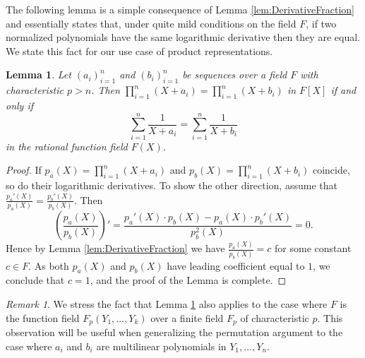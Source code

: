 \documentclass[11pt]{article}
\newtheorem{lem}[]{Lemma}
\theoremstyle{definition}
\theoremstyle{remark}
\newtheorem{rem}[thm]{Remark}
\begin{document}
The following lemma is a simple consequence of Lemma \ref{lem:DerivativeFraction} and essentially states that, under quite mild conditions on the field $F$, if two normalized polynomials have the same logarithmic derivative then they are equal. 
We state this fact for our use case of product representations.
\begin{lem}
\label{lem:LogarithmicDerivative}
Let $(a_i)_{i=1}^n$ and $(b_i)_{i=1}^n$ be sequences  over a field $F$ with characteristic $p > n$. 
Then
$
\prod_{i=1}^n \left(X + a_i \right) =\prod_{i=1}^n \left(X + b_i \right)
$
in $F[X]$ if and only if  
\begin{equation*}
\sum_{i=1}^n \frac{1}{X + a_i} =\sum_{i=1} ^n\frac{1}{X + b_i}
\end{equation*}
in the rational function field $F(X)$.
\end{lem}

\begin{proof}
If  $p_a(X) = \prod_{i=1}^n \left(X + a_i\right)$ and $p_b(X) = \prod_{i=1}^n \left(X + b_i\right)$
coincide, so do their logarithmic derivatives.
To show the other direction, assume that 
$
\frac{p_a'(X)}{p_a(X)}  = \frac{p_b'(X)}{p_b(X)}.
$
Then 
\[
\left(\frac{p_a(X)}{p_b(X)}\right)'  = \frac{p_a'(X)\cdot p_b(X) - p_a(X)\cdot  p_b'(X)} {p_b^2(X)} = 0.
\]
Hence by Lemma \ref{lem:DerivativeFraction} we have $\frac{p_a(X)}{p_b(X)} = c$ for some constant  $c \in F$.
As both $p_a(X)$ and $p_b(X)$ have leading coefficient equal to $1$, we conclude that $c =1$, and the proof of the Lemma is complete.
\end{proof}
\begin{rem}
\label{rem:LogarithmicDerivativeFunctionField}
We stress the fact that Lemma \ref{lem:LogarithmicDerivative} also applies to the case where $F$  is the function field $F_p(Y_1,\ldots, Y_k)$ over a finite field $F_p$ of characteristic $p$.
This observation will be useful when generalizing the permutation argument to the case where $a_i$ and $b_i$ are multilinear polynomials in $Y_1, \ldots, Y_n$.
\end{rem}
\end{document}
